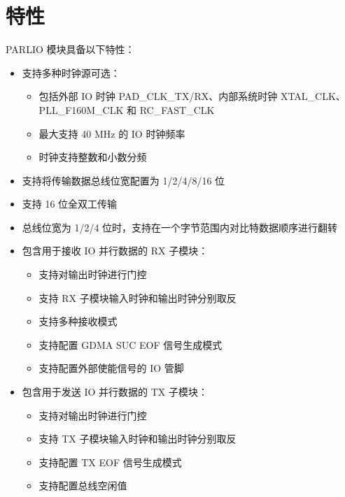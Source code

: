 \documentclass[main\_\_CN.tex]{subfiles}
\begin{document}

\section{特性}
\label{sec:parlio-features}

PARLIO 模块具备以下特性：

\begin{itemize}
    \item 支持多种时钟源可选：
    \begin{itemize}
        \item 包括外部 IO 时钟 PAD\_CLK\_TX/RX、内部系统时钟 XTAL\_CLK、PLL\_F160M\_CLK 和 RC\_FAST\_CLK
        \item 最大支持 40 MHz 的 IO 时钟频率
        \item 时钟支持整数和小数分频
    \end{itemize}
    \item 支持将传输数据总线位宽配置为 1/2/4/8/16 位
    \item 支持 16 位全双工传输
    \item 总线位宽为 1/2/4 位时，支持在一个字节范围内对比特数据顺序进行翻转
    \item 包含用于接收 IO 并行数据的 RX 子模块：
    \begin{itemize}
        \item 支持对输出时钟进行门控
        \item 支持 RX 子模块输入时钟和输出时钟分别取反
        \item 支持多种接收模式
        \item 支持配置 GDMA SUC EOF 信号生成模式
        \item 支持配置外部使能信号的 IO 管脚
    \end{itemize}
    \item 包含用于发送 IO 并行数据的 TX 子模块：
    \begin{itemize}
        \item 支持对输出时钟进行门控
        \item 支持 TX 子模块输入时钟和输出时钟分别取反
        \item 支持配置 TX EOF 信号生成模式
        \item 支持配置总线空闲值
    \end{itemize}
\end{itemize}
\end{document}
